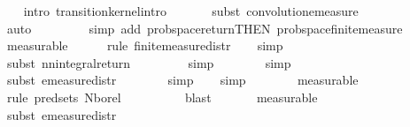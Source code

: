 \begin{isabellebody}
%
\isadelimproof
\ \ %
\endisadelimproof
%
\isatagproof
{}\isamarkupfalse%
\ {\isacharparenleft}{\kern0pt}intro\ transition{\isacharunderscore}{\kern0pt}kernel{\isachardot}{\kern0pt}intro{\isacharparenright}{\kern0pt}\isanewline
\ \ \ \ \ \isamarkupfalse%
\ {\isacharparenleft}{\kern0pt}subst\ convolution{\isacharunderscore}{\kern0pt}emeasure{\isacharparenright}{\kern0pt}\isanewline
\ \ \ \ \ \ \ \ \ \ \ \ \ \isamarkupfalse%
\ auto\isanewline
\ \ \ \ \ \ \ \isamarkupfalse%
\ {\isacharparenleft}{\kern0pt}simp\ add{\isacharcolon}{\kern0pt}\ prob{\isacharunderscore}{\kern0pt}space{\isacharunderscore}{\kern0pt}return{\isacharbrackleft}{\kern0pt}THEN\ prob{\isacharunderscore}{\kern0pt}space{\isachardot}{\kern0pt}finite{\isacharunderscore}{\kern0pt}measure{\isacharbrackright}{\kern0pt}{\isacharparenright}{\kern0pt}\isanewline
\ \ \ \ \ \ \isamarkupfalse%
\ measurable\isanewline
\ \ \ \ \isamarkupfalse%
\ {\isacharparenleft}{\kern0pt}rule\ finite{\isacharunderscore}{\kern0pt}measure{\isacharunderscore}{\kern0pt}distr{\isacharparenright}{\kern0pt}\isanewline
\ \ \isamarkupfalse%
\ {\isacharparenleft}{\kern0pt}simp{\isacharparenright}{\kern0pt}\isanewline
\ \ \ \ \ \isamarkupfalse%
\ {\isacharparenleft}{\kern0pt}subst\ nn{\isacharunderscore}{\kern0pt}integral{\isacharunderscore}{\kern0pt}return{\isacharparenright}{\kern0pt}\isanewline
\ \ \ \ \ \ \ \isamarkupfalse%
\ simp\isanewline
\ \ \ \ \ \ \isamarkupfalse%
\ simp\isanewline
\ \ \ \ \ \ \isamarkupfalse%
\ {\isacharparenleft}{\kern0pt}subst\ emeasure{\isacharunderscore}{\kern0pt}distr{\isacharparenright}{\kern0pt}\isanewline
\ \ \ \ \ \ \isamarkupfalse%
\ simp\isanewline
\ \ \isamarkupfalse%
\ simp\isanewline
\ \ \ \ \ \ \isamarkupfalse%
\ measurable\isanewline
\ \ \ \ \ \ \ \isamarkupfalse%
\ {\isacharparenleft}{\kern0pt}rule\ pred{\isacharunderscore}{\kern0pt}sets{}{\isacharbrackleft}{\kern0pt}\ N{\isacharequal}{\kern0pt}borel{\isacharbrackright}{\kern0pt}{\isacharparenright}{\kern0pt}\isanewline
\ \ \ \ \ \ \ \ \isamarkupfalse%
\ blast\isanewline
\ \ \ \ \ \isamarkupfalse%
\ measurable\isanewline
\ \ \ \ \ \ \isamarkupfalse%
\ {\isacharparenleft}{\kern0pt}subst\ emeasure{\isacharunderscore}{\kern0pt}distr{\isacharparenright}{\kern0pt}\isanewline
\ \ \ \ \isamarkupfalse%

\end{isabellebody}
